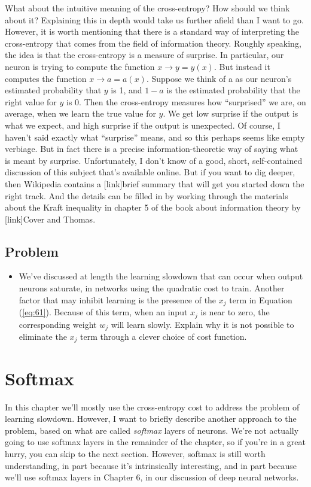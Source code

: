 \documentclass[a4paper,twoside,10pt]{book}
\begin{document}
What about the intuitive meaning of the cross-entropy? How should we think about it? Explaining this in depth would take us further afield than I want to go. However, it is worth mentioning that there is a standard way of interpreting the cross-entropy that comes from the field of information theory. Roughly speaking, the idea is that the cross-entropy is a measure of surprise. In particular, our neuron is trying to compute the function $x\to y=y(x)$. But instead it computes the function $x \to a=a(x)$. Suppose we think of a as our neuron's estimated probability that $y$ is 1, and $1-a$ is the estimated probability that the right value for $y$ is 0. Then the cross-entropy measures how ``surprised'' we are, on average, when we learn the true value for $y$. We get low surprise if the output is what we expect, and high surprise if the output is unexpected. Of course, I haven't said exactly what ``surprise'' means, and so this perhaps seems like empty verbiage. But in fact there is a precise information-theoretic way of saying what is meant by surprise. Unfortunately, I don't know of a good, short, self-contained discussion of this subject that's available online. But if you want to dig deeper, then Wikipedia contains a [link]brief summary that will get you started down the right track. And the details can be filled in by working through the materials about the Kraft inequality in chapter 5 of the book about information theory by [link]Cover and Thomas.

\subsection*{Problem}
\begin{itemize}
	\item We've discussed at length the learning slowdown that can occur when output neurons saturate, in networks using the quadratic cost to train. Another factor that may inhibit learning is the presence of the $x_j$ term in Equation (\ref{eq:61}). Because of this term, when an input $x_j$ is near to zero, the corresponding weight $w_j$ will learn slowly. Explain why it is not possible to eliminate the $x_j$ term through a clever choice of cost function.
\end{itemize}

\section{Softmax}
In this chapter we'll mostly use the cross-entropy cost to address the problem of learning slowdown. However, I want to briefly describe another approach to the problem, based on what are called \textit{softmax} layers of neurons. We're not actually going to use softmax layers in the remainder of the chapter, so if you're in a great hurry, you can skip to the next section. However, softmax is still worth understanding, in part because it's intrinsically interesting, and in part because we'll use softmax layers in Chapter 6, in our discussion of deep neural networks.
\end{document}

